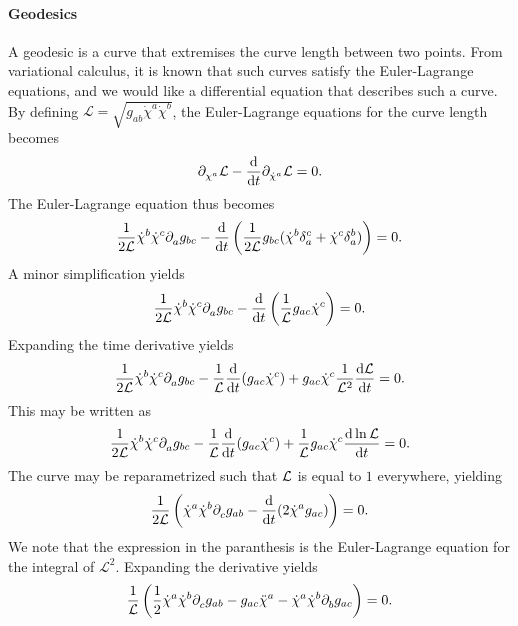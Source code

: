 \paragraph{Geodesics}
A geodesic is a curve that extremises the curve length between two points. From variational calculus, it is known that such curves satisfy the Euler-Lagrange equations, and we would like a differential equation that describes such a curve. By defining $\mathcal{L} = \sqrt{g_{ab}\dot{\chi}^{a}\dot{\chi}^{b}}$, the Euler-Lagrange equations for the curve length becomes
\begin{align*}
	\partial^{}_{\chi^{a}}\mathcal{L} - \dv{t}\partial^{}_{\dot{\chi}^{a}}\mathcal{L} = 0.
\end{align*}
The Euler-Lagrange equation thus becomes
\begin{align*}
	\frac{1}{2\mathcal{L}}\dot{\chi}^{b}\dot{\chi}^{c}\partial^{}_{a}g_{bc} - \dv{t}\left(\frac{1}{2\mathcal{L}}g_{bc}(\dot{\chi}^{b}\delta_{a}^{c} + \dot{\chi}^{c}\delta_{a}^{b})\right) = 0.
\end{align*}
A minor simplification yields
\begin{align*}
	\frac{1}{2\mathcal{L}}\dot{\chi}^{b}\dot{\chi}^{c}\partial^{}_{a}g_{bc} - \dv{t}\left(\frac{1}{\mathcal{L}}g_{ac}\dot{\chi}^{c}\right) = 0.
\end{align*}
Expanding the time derivative yields
\begin{align*}
	\frac{1}{2\mathcal{L}}\dot{\chi}^{b}\dot{\chi}^{c}\partial^{}_{a}g_{bc} - \frac{1}{\mathcal{L}}\dv{t}(g_{ac}\dot{\chi}^{c}) + g_{ac}\dot{\chi}^{c}\frac{1}{\mathcal{L}^{2}}\dv{\mathcal{L}}{t} = 0.
\end{align*}
This may be written as
\begin{align*}
	\frac{1}{2\mathcal{L}}\dot{\chi}^{b}\dot{\chi}^{c}\partial^{}_{a}g_{bc} - \frac{1}{\mathcal{L}}\dv{t}(g_{ac}\dot{\chi}^{c}) + \frac{1}{\mathcal{L}}g_{ac}\dot{\chi}^{c}\dv{\ln{\mathcal{L}}}{t} = 0.
\end{align*}
The curve may be reparametrized such that $\mathcal{L}$ is equal to $1$ everywhere, yielding
\begin{align*}
	\frac{1}{2\mathcal{L}}\left(\dot{\chi}^{a}\dot{\chi}^{b}\partial^{}_{c}g_{ab} - \dv{t}(2\dot{\chi}^{a}g_{ac})\right) = 0.
\end{align*}
We note that the expression in the paranthesis is the Euler-Lagrange equation for the integral of $\mathcal{L}^{2}$. Expanding the derivative yields
\begin{align*}
	\frac{1}{\mathcal{L}}\left(\frac{1}{2}\dot{\chi}^{a}\dot{\chi}^{b}\partial^{}_{c}g_{ab} - g_{ac}\ddot{\chi}^{a} - \dot{\chi}^{a}\dot{\chi}^{b}\partial^{}_{b}g_{ac}\right) = 0.
\end{align*}
